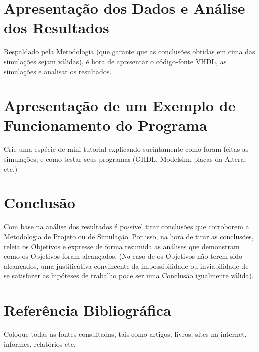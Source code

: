 \documentclass[12pt,a4paper]{article}
\begin{document}
\section{Apresentação dos Dados e Análise dos Resultados}
Respaldado pela Metodologia (que garante que as conclusões obtidas em cima das
simulações sejam válidas), é hora de apresentar o código-fonte VHDL, as simulações e
analisar os resultados.

\section{Apresentação de um Exemplo de Funcionamento do Programa}
Crie uma espécie de mini-tutorial explicando sucintamente como foram feitas as
simulações, e como testar seus programas (GHDL, Modelsim, placas da Altera, etc.)

\section{Conclusão}
Com base na análise dos resultados é possível tirar conclusões que corroborem a
Metodologia de Projeto ou de Simulação. Por isso, na hora de tirar as conclusões,
releia os Objetivos e expresse de forma resumida as análises que demonstram como os
Objetivos foram alcançados. (No caso de os Objetivos não terem sido alcançados, uma
justificativa convincente da impossibilidade ou inviabilidade de se satisfazer as
hipóteses de trabalho pode ser uma Conclusão igualmente válida).

\section{Referência Bibliográfica}
Coloque todas as fontes consultadas, tais como artigos, livros, sites na internet,
informes, relatórios etc.
\end{document}
